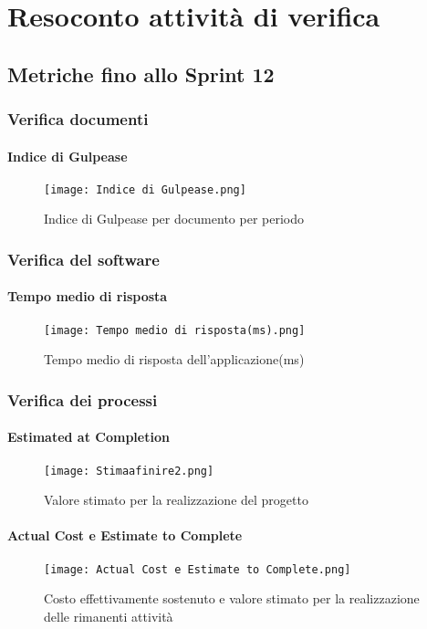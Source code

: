 \chapter{Resoconto attività di verifica}

\section{Metriche fino allo Sprint 12}

  \subsection{Verifica documenti}
    \subsubsection{Indice di Gulpease}
    \begin{figure}[H]
      \centering
      \texttt{[image: Indice di Gulpease.png]}
      \caption{Indice di Gulpease per documento per periodo}
    \end{figure}

  \subsection{Verifica del software}
    \subsubsection{Tempo medio di risposta}
    \begin{figure}[H]
      \centering
      \texttt{[image: Tempo medio di risposta(ms).png]}
      \caption{Tempo medio di risposta dell'applicazione(ms)}
    \end{figure}


  \subsection{Verifica dei processi}
    \subsubsection{Estimated at Completion}
    \begin{figure}[H]
      \centering
      \texttt{[image: Stimaafinire2.png]}
      \caption{Valore stimato per la realizzazione del progetto}
    \end{figure}

    \subsubsection{Actual Cost e Estimate to Complete}
    \begin{figure}[H]
      \centering
      \texttt{[image: Actual Cost e Estimate to Complete.png]}
      \caption{Costo effettivamente sostenuto e valore stimato per la realizzazione delle rimanenti attività}
    \end{figure}


